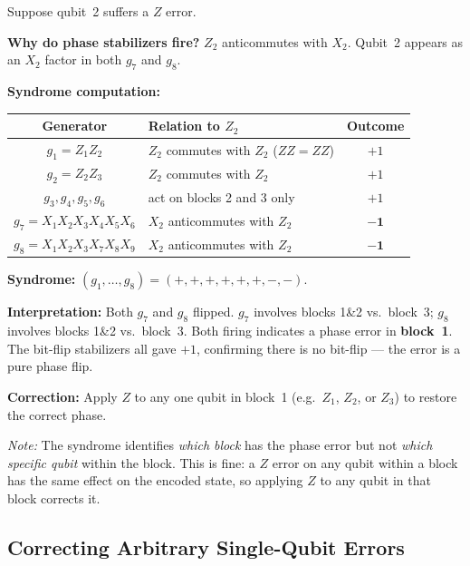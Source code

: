 \documentclass[11pt, a4paper]{article}
\theoremstyle{definition}
\theoremstyle{plain}
\theoremstyle{remark}
\begin{document}
\begin{workedexample}
Suppose qubit~2 suffers a $Z$ error.

\medskip\noindent
\textbf{Why do phase stabilizers fire?}
$Z_2$ anticommutes with $X_2$.  Qubit~2 appears as an $X_2$ factor in
both $g_7$ and $g_8$.

\medskip\noindent
\textbf{Syndrome computation:}
\begin{center}
\renewcommand{\arraystretch}{1.4}
\begin{tabular}{clc}
\hline
Generator & Relation to $Z_2$ & Outcome \\
\hline
$g_1 = Z_1 Z_2$ & $Z_2$ commutes with $Z_2$ ($ZZ = ZZ$) & $+1$ \\
$g_2 = Z_2 Z_3$ & $Z_2$ commutes with $Z_2$ & $+1$ \\
$g_3,g_4,g_5,g_6$ & act on blocks 2 and 3 only & $+1$ \\
$g_7 = X_1 X_2 X_3 X_4 X_5 X_6$ & $X_2$ anticommutes with $Z_2$ & $\mathbf{-1}$ \\
$g_8 = X_1 X_2 X_3 X_7 X_8 X_9$ & $X_2$ anticommutes with $Z_2$ & $\mathbf{-1}$ \\
\hline
\end{tabular}
\end{center}

\medskip\noindent
\textbf{Syndrome:} $(g_1,\ldots,g_8) = (+,+,+,+,+,+,-,-)$.

\medskip\noindent
\textbf{Interpretation:} Both $g_7$ and $g_8$ flipped.  $g_7$ involves
blocks 1\&2 vs.\ block~3; $g_8$ involves blocks 1\&2 vs.\ block~3.
Both firing indicates a phase error in \textbf{block~1}.
The bit-flip stabilizers all gave $+1$, confirming there is no
bit-flip --- the error is a pure phase flip.

\medskip\noindent
\textbf{Correction:} Apply $Z$ to any one qubit in block~1
(e.g.\ $Z_1$, $Z_2$, or $Z_3$) to restore the correct phase.

\medskip
\textit{Note:} The syndrome identifies \emph{which block} has the phase
error but not \emph{which specific qubit} within the block.  This is
fine: a $Z$ error on any qubit within a block has the same effect on
the encoded state, so applying $Z$ to any qubit in that block corrects
it.
\end{workedexample}

\subsection{Correcting Arbitrary Single-Qubit Errors}
\end{document}
